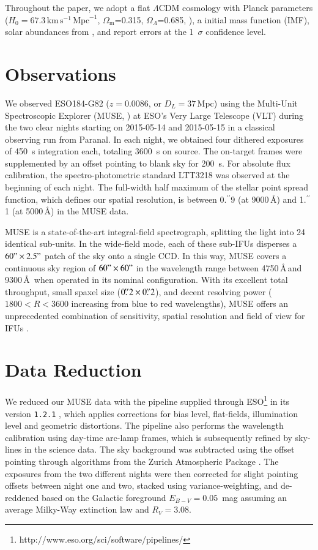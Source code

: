 \documentclass[traditabstract, referee]{aa}
\newcommand{\farc}{\hbox{$.\!\!^{\prime\prime}$}}
\begin{document}
Throughout the paper, we adopt a flat $\Lambda$CDM cosmology with Planck parameters ($H_0=67.3\,\mathrm{km}\,\mathrm{s}^{-1}\,\mathrm{Mpc}^{-1}$, $\Omega_\mathrm{m}$=0.315, $\Omega_\Lambda$=0.685, \citealt{2014A&A...571A..16P}), a \citet{2003PASP..115..763C} initial mass function (IMF), solar abundances from \citet{2009ARA&A..47..481A}, and report errors at the 1~$\sigma$ confidence level.

\section{Observations}

We observed ESO184-G82 ($z=0.0086$, or $D_L=37$\,Mpc) using the Multi-Unit Spectroscopic Explorer (MUSE, \citealp{2010SPIE.7735E..08B}) at ESO's Very Large Telescope (VLT) during the two clear nights starting on 2015-05-14 and 2015-05-15 in a classical observing run from Paranal. In each night, we obtained four dithered exposures of 450~s integration each, totaling 3600~s on source. The on-target frames were supplemented by an offset pointing to blank sky for 200~s. For absolute flux calibration, the spectro-photometric standard LTT3218 was observed at the beginning of each night. The full-width half maximum of the stellar point spread function, which defines our spatial resolution, is between 0\farc{9} (at 9000\,\AA) and 1\farc{1} (at 5000\,\AA) in the MUSE data.

MUSE is a state-of-the-art integral-field spectrograph, splitting the light into 24 identical sub-units. In the wide-field mode, each of these sub-IFUs disperses a $60"\times 2.5"$ patch of the sky onto a single CCD. In this way, MUSE covers a continuous sky region of $60"\times 60"$ in the wavelength range between 4750\,\AA\,and 9300\,\AA\, when operated in its nominal configuration. With its excellent total throughput, small spaxel size ($0\farc{2} \times 0\farc{2}$), and decent resolving power ($1800 < R < 3600$ increasing from blue to red wavelengths), MUSE offers an unprecedented combination of sensitivity, spatial resolution and field of view for IFUs \citep{2010SPIE.7735E..08B}.

\section{Data Reduction}
\label{sec:red}
We reduced our MUSE data with the pipeline supplied through ESO\footnote{http://www.eso.org/sci/software/pipelines/} in its version \texttt{1.2.1} \citep{2014ASPC..485..451W}, which applies corrections for bias level, flat-fields, illumination level and geometric distortions. The pipeline also performs the wavelength calibration using day-time arc-lamp frames, which is subsequently refined by sky-lines in the science data. The sky background was subtracted using the offset pointing through algorithms from the Zurich Atmospheric Package \citep{2016MNRAS.458.3210S}. The exposures from the two different nights were then corrected for slight pointing offsets between night one and two, stacked using variance-weighting, and de-reddened based on the Galactic foreground $E_{B-V}=0.05$~mag \citep{2011ApJ...737..103S} assuming an average Milky-Way extinction law \citep{1992ApJ...395..130P} and $R_V=3.08$. 
\end{document}
